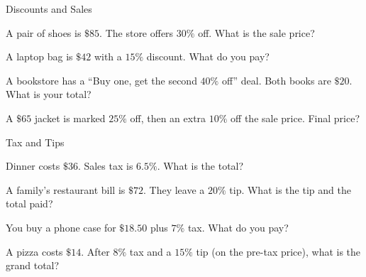 \begin{practiceBox}{Discounts and Sales}


\prob A pair of shoes is $\$85$. The store offers $30\%$ off. What is the sale price?
\answerBlank[3cm]

\prob A laptop bag is $\$42$ with a $15\%$ discount. What do you pay?
\answerBlank[3cm]

\prob A bookstore has a ``Buy one, get the second $40\%$ off'' deal. Both books are $\$20$. What is your total?
\answerBlank[3cm]

\prob A $\$65$ jacket is marked $25\%$ off, then an extra $10\%$ off the sale price. Final price?
\answerBlank[3cm]

\end{practiceBox}

\begin{practiceBox}[funTeal]{Tax and Tips}


\prob Dinner costs $\$36$. Sales tax is $6.5\%$. What is the total?
\answerBlank[3cm]

\prob A family's restaurant bill is $\$72$. They leave a $20\%$ tip. What is the tip and the total paid?
\answerBlank[3cm]

\prob You buy a phone case for $\$18.50$ plus $7\%$ tax. What do you pay?
\answerBlank[3cm]

\prob A pizza costs $\$14$. After $8\%$ tax and a $15\%$ tip (on the pre-tax price), what is the grand total?
\answerBlank[3cm]

\end{practiceBox}

